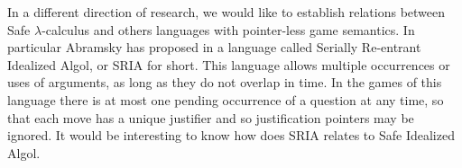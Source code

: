 In a different direction of research, we would like to establish relations between
Safe $\lambda$-calculus and others languages with pointer-less game semantics.
In particular Abramsky has proposed in \cite{abramsky:mchecking_ia} a language
called Serially Re-entrant Idealized Algol, or SRIA for short. This
language allows multiple occurrences or uses of arguments, as long
as they do not overlap in time. In the games of this language there
is at most one pending occurrence of a question at any time, so that
each move has a unique justifier and so justification pointers may
be ignored. It would be interesting to know how does SRIA relates to Safe Idealized Algol.
